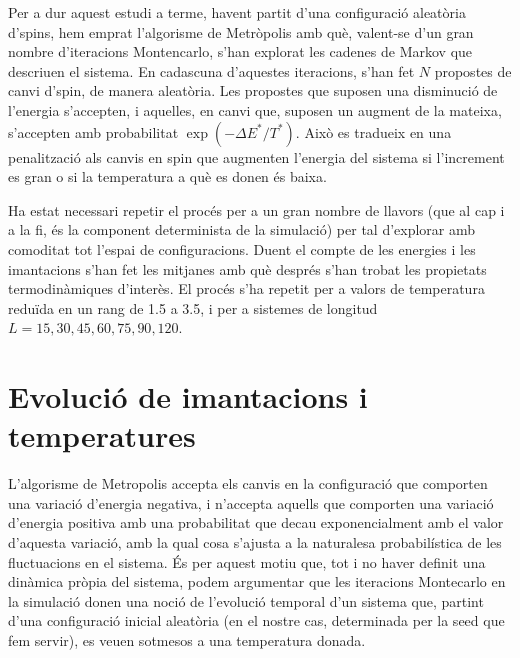 \documentclass[a4paper]{article}
\begin{document}
Per a dur aquest estudi a terme, havent partit d'una configuració aleatòria d'spins, hem emprat l'algorisme de Metròpolis amb què, valent-se d'un gran nombre d'iteracions Montencarlo, s'han explorat les cadenes de Markov que descriuen el sistema. En cadascuna d'aquestes iteracions, s'han fet $N$ propostes de canvi d'spin, de manera aleatòria. Les propostes que suposen una disminució de l'energia s'accepten, i aquelles, en canvi que, suposen un augment de la mateixa, s'accepten amb probabilitat $\exp\left(-\Delta E^*/T^*\right)$. Això es tradueix en una penalització als canvis en spin que augmenten l'energia del sistema si l'increment es gran o si la temperatura a què es donen és baixa.

Ha estat necessari repetir el procés per a un gran nombre de llavors (que al cap i a la fi, és la component determinista de la simulació) per tal d'explorar amb comoditat tot l'espai de configuracions. Duent el compte de les energies i les imantacions s'han fet les mitjanes amb què després s'han trobat les propietats termodinàmiques d'interès. El procés s'ha repetit per a valors de temperatura reduïda en un rang de 1.5 a 3.5, i per a sistemes de longitud $L=15,30,45,60,75,90,120$.

\section{Evolució de imantacions i temperatures}

L'algorisme de Metropolis accepta els canvis en la configuració que comporten una variació d'energia negativa, i n'accepta aquells que comporten una variació d'energia positiva amb una probabilitat que decau exponencialment amb el valor d'aquesta variació, amb la qual cosa s'ajusta a la naturalesa probabilística de les fluctuacions en el sistema. És per aquest motiu que, tot i no haver definit una dinàmica pròpia del sistema, podem argumentar que les iteracions Montecarlo en la simulació donen una noció de l'evolució temporal d'un sistema que, partint d'una configuració inicial aleatòria (en el nostre cas, determinada per la seed que fem servir), es veuen sotmesos a una temperatura donada.
\end{document}
